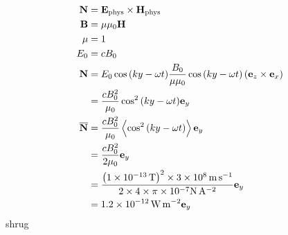 \subsection{}
\begin{align*}
    \mathbf{N} & = \mathbf{E}_{\textrm{phys}} \times \mathbf{H}_{\textrm{phys}}\\
    \mathbf{B} & = \mu \mu_0 \mathbf{H}\\
    \mu & = 1\\
    E_0 & = c B_0\\
    \mathbf{N} & = E_0 \cos{\del{ky - \omega t}} \frac{B_0}{\mu \mu_0} \cos{\del{ky - \omega t}} \del{\mathbf{e}_z \times \mathbf{e}_x}\\
    & = \frac{c B_0^2}{\mu_0} \cos^2{\del{ky - \omega t}} \mathbf{e}_y\\
    \overline{\mathbf{N}} & = \frac{c B_0^2}{\mu_0} \expectationvalue{\cos^2{\del{ky - \omega t}}} \mathbf{e}_y\\
    & = \frac{c B_0^2}{2 \mu_0} \mathbf{e}_y\\
    & = \frac{\del{\SI{1e-13}{\tesla}}^2 \times \SI{3e8}{\metre\second\tothe{-1}}}{2 \times 4 \times \pi \times 10^{-7} \si{\newton\ampere\tothe{-2}}} \mathbf{e}_y\\
    & = \SI{1.2e-12}{\watt\metre\tothe{-2}} \mathbf{e}_y
\end{align*}
shrug

